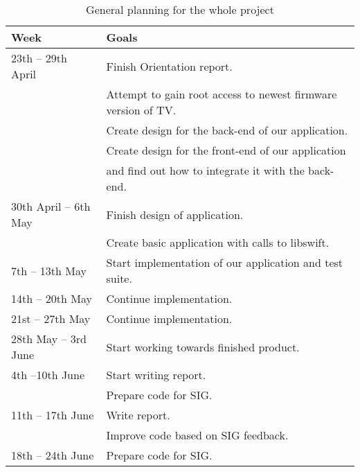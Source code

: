 \begin{table}[h]
	\begin{tabular}{|l|l|}

\hline
	Week & Goals \\ \hline
	23th -- 29th April & Finish Orientation report. \\
	& Attempt to gain root access to newest firmware version of TV. \\
	& Create design for the back-end of our application. \\
	& Create design for the front-end of our application 
	\\ & and find out how to integrate it with the back-end. \\ \hline
	
	30th April -- 6th May & Finish design of application. \\ 
	& Create basic application with calls to libswift. \\ \hline
	
	7th -- 13th May & Start implementation of our application and test suite. \\ \hline
	14th -- 20th May & Continue implementation. \\ \hline
	21st -- 27th May & Continue implementation. \\ \hline 
	28th May -- 3rd June & Start working towards finished product. \\ \hline 
	4th --10th June & Start writing report. \\
	& Prepare code for SIG. \\ \hline
	
	11th -- 17th June & Write report. \\
	& Improve code based on SIG feedback. \\ \hline
	
	18th -- 24th June & Prepare code for SIG. \\ \hline

	\end{tabular}
	\caption{General planning for the whole project}
	\label{tab:planning}
\end{table}
